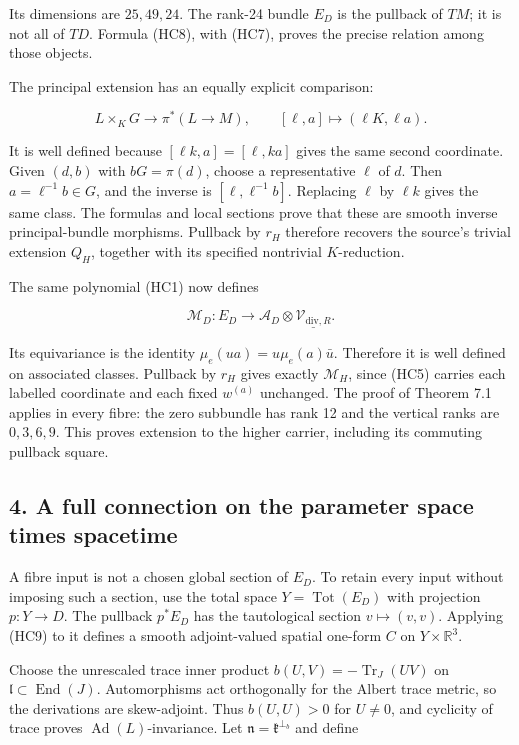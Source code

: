 \documentclass[11pt]{article}
\begin{document}
Its dimensions are \(25,49,24\). The rank-24 bundle \(E_D\) is the
pullback of \(TM\); it is not all of \(TD\). Formula (HC8), with (HC7),
proves the precise relation among those objects.

The principal extension has an equally explicit comparison:

\[
 L\times_KG\longrightarrow\pi^*(L\to M),\qquad
 [\ell,a]\longmapsto(\ell K,\ell a).
\]

It is well defined because \([\ell k,a]=[\ell,ka]\) gives the same
second coordinate. Given \((d,b)\) with \(bG=\pi(d)\), choose a
representative \(\ell\) of \(d\). Then \(a=\ell^{-1}b\in G\), and the
inverse is \([\ell,\ell^{-1}b]\). Replacing \(\ell\) by \(\ell k\)
gives the same class. The formulas and local sections prove that these
are smooth inverse principal-bundle morphisms. Pullback by \(r_H\)
therefore recovers the source's trivial extension \(Q_H\), together
with its specified nontrivial \(K\)-reduction.

The same polynomial (HC1) now defines

\[
 \mathcal M_D:E_D\longrightarrow
 \mathcal A_D\otimes\underline{\mathcal V_{\mathrm{div},R}}.
 \tag{HC9}
\]

Its equivariance is the identity
\(\mu_e(ua)=u\mu_e(a)\bar u\). Therefore it is well defined on associated
classes. Pullback by \(r_H\) gives exactly \(\mathcal M_H\), since (HC5)
carries each labelled coordinate and each fixed \(w^{(a)}\) unchanged.
The proof of Theorem 7.1 applies in every fibre: the zero subbundle has
rank 12 and the vertical ranks are \(0,3,6,9\). This proves extension to
the higher carrier, including its commuting pullback square.

\subsection*{4. A full connection on the parameter space times spacetime}

A fibre input is not a chosen global section of \(E_D\). To retain every
input without imposing such a section, use the total space \(Y=\operatorname{Tot}(E_D)\)
with projection \(p:Y\to D\). The pullback \(p^*E_D\) has the tautological
section \(v\mapsto(v,v)\). Applying (HC9) to it defines a smooth adjoint-valued
spatial one-form \(C\) on \(Y\times\mathbb R^3\).

Choose the unrescaled trace inner product
\(b(U,V)=-\operatorname{Tr}_{J}(UV)\) on \(\mathfrak l\subset\operatorname{End}(J)\).
Automorphisms act orthogonally for the Albert trace metric, so the
derivations are skew-adjoint. Thus \(b(U,U)>0\) for \(U\ne0\), and cyclicity
of trace proves \(\operatorname{Ad}(L)\)-invariance. Let
\(\mathfrak n=\mathfrak k^{\perp_b}\) and define
\end{document}
